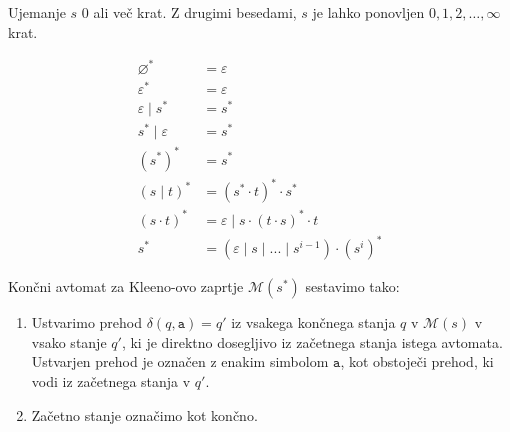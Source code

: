 \documentclass{report}
\makeatletter
\newcommand{\Empty}{\varnothing}
\newcommand{\Null}{\varepsilon}
\newcommand{\Automaton}[1]{\mathcal{M}(#1)}
\newcommand{\Char}[1]{\texttt{#1}}
\newcommand{\Seq}{\cdot}
\newcommand{\Union}{\mathrel{|}}
\newcommand{\Kleene}[1]{{#1}^\ast}
\newcommand{\Rep}[2]{{#1}^{#2}}
\DeclareRobustCommand{\Dots}{%
  \vbox{
    \baselineskip4\p@\lineskiplimit\z@
    \kern-\p@
    \hbox{.}\hbox{.}\hbox{.}
  }}
\makeatother
\begin{document}
Ujemanje $s$ 0 ali več krat.
Z drugimi besedami, $s$ je lahko ponovljen $0, 1, 2, \dots, \infty$ krat.

\begin{tcolorbox}[title={Pravila}]
  \begin{equation*}
    \begin{aligned}
      \Kleene{\Empty} &= \Null\\
      \Kleene{\Null} &= \Null\\
      \Null \Union \Kleene{s} &= \Kleene{s}\\
      \Kleene{s} \Union \Null &= \Kleene{s}\\
      \Kleene{(\Kleene{s})} &= \Kleene{s}\\
      \Kleene{(s \Union t)} &= \Kleene{(\Kleene{s} \Seq t)} \Seq \Kleene{s}\\
      \Kleene{(s \Seq t)} &= \Null \Union s \Seq \Kleene{(t \Seq s)} \Seq t\\
      \Kleene{s} &= (\Null \Union s \Union ... \Union \Rep{s}{i - 1}) \Seq \Kleene{(\Rep{s}{i})}
    \end{aligned}
  \end{equation*}
\end{tcolorbox}

Končni avtomat za Kleeno-ovo zaprtje $\Automaton{\Kleene{s}}$ sestavimo tako:
\begin{enumerate}
  \item Ustvarimo prehod $\delta(q, \Char{a}) = q'$ iz vsakega končnega stanja $q$ v $\Automaton{s}$ v vsako stanje $q'$, ki je direktno dosegljivo iz začetnega stanja istega avtomata.
    Ustvarjen prehod je označen z enakim simbolom $\Char{a}$, kot obstoječi prehod, ki vodi iz začetnega stanja v $q'$.
  \item Začetno stanje označimo kot končno.
\end{enumerate}

\begin{center}
\end{center}
\end{document}
